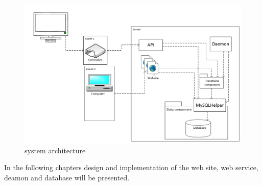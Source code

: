 \begin{figure}
	\centering
		\includegraphics[width=1.25\textwidth,  angle=90]{images/serveroverview.jpg}
	\caption{system architecture}
	\label{fig:serveroverview}
\end{figure}

In the following chapters design and implementation of the web site, web service, deamon and database will be presented.

 


